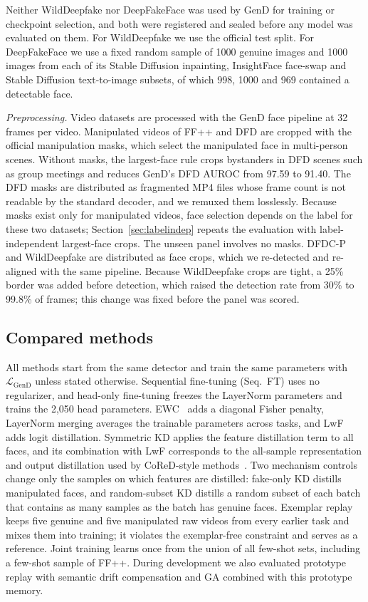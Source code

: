 \documentclass{ieeeaccess}
\newcommand{\ffpp}{FF{+}{+}}
\begin{document}
Neither WildDeepfake nor DeepFakeFace was used by GenD for training or checkpoint selection, and both were registered and sealed before any model was evaluated on them. For WildDeepfake we use the official test split. For DeepFakeFace we use a fixed random sample of 1000 genuine images and 1000 images from each of its Stable Diffusion inpainting, InsightFace face-swap and Stable Diffusion text-to-image subsets, of which 998, 1000 and 969 contained a detectable face.

\textit{Preprocessing.} Video datasets are processed with the GenD face pipeline at 32 frames per video. Manipulated videos of \ffpp{} and DFD are cropped with the official manipulation masks, which select the manipulated face in multi-person scenes. Without masks, the largest-face rule crops bystanders in DFD scenes such as group meetings and reduces GenD's DFD AUROC from 97.59 to 91.40. The DFD masks are distributed as fragmented MP4 files whose frame count is not readable by the standard decoder, and we remuxed them losslessly. Because masks exist only for manipulated videos, face selection depends on the label for these two datasets; Section~\ref{sec:labelindep} repeats the evaluation with label-independent largest-face crops. The unseen panel involves no masks. DFDC-P and WildDeepfake are distributed as face crops, which we re-detected and re-aligned with the same pipeline. Because WildDeepfake crops are tight, a 25\% border was added before detection, which raised the detection rate from 30\% to 99.8\% of frames; this change was fixed before the panel was scored.

\subsection{Compared methods}
All methods start from the same detector and train the same parameters with $\mathcal{L}_{\mathrm{GenD}}$ unless stated otherwise. Sequential fine-tuning (Seq.\ FT) uses no regularizer, and head-only fine-tuning freezes the LayerNorm parameters and trains the 2{,}050 head parameters. EWC~\cite{kirkpatrick2017ewc} adds a diagonal Fisher penalty, LayerNorm merging averages the trainable parameters across tasks, and LwF~\cite{li2018lwf} adds logit distillation. Symmetric KD applies the feature distillation term to all faces, and its combination with LwF corresponds to the all-sample representation and output distillation used by CoReD-style methods~\cite{kim2021cored}. Two mechanism controls change only the samples on which features are distilled: fake-only KD distills manipulated faces, and random-subset KD distills a random subset of each batch that contains as many samples as the batch has genuine faces. Exemplar replay keeps five genuine and five manipulated raw videos from every earlier task and mixes them into training; it violates the exemplar-free constraint and serves as a reference. Joint training learns once from the union of all few-shot sets, including a few-shot sample of \ffpp{}. During development we also evaluated prototype replay with semantic drift compensation and GA combined with this prototype memory.
\end{document}
